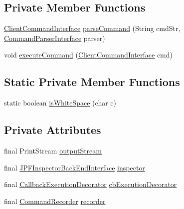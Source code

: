 \subsection*{Private Member Functions}
\begin{DoxyCompactItemize}
\item 
\hyperlink{interfacegov_1_1nasa_1_1jpf_1_1inspector_1_1client_1_1_client_command_interface}{Client\+Command\+Interface} \hyperlink{classgov_1_1nasa_1_1jpf_1_1inspector_1_1client_1_1_j_p_f_inspector_client_a5afa0d46d2d8be66673644f06e8f1bba}{parse\+Command} (String cmd\+Str, \hyperlink{interfacegov_1_1nasa_1_1jpf_1_1inspector_1_1client_1_1parser_1_1_command_parser_interface}{Command\+Parser\+Interface} parser)
\item 
void \hyperlink{classgov_1_1nasa_1_1jpf_1_1inspector_1_1client_1_1_j_p_f_inspector_client_ab0a5a605903e630c3cb672fcb0b02201}{execute\+Command} (\hyperlink{interfacegov_1_1nasa_1_1jpf_1_1inspector_1_1client_1_1_client_command_interface}{Client\+Command\+Interface} cmd)
\end{DoxyCompactItemize}
\subsection*{Static Private Member Functions}
\begin{DoxyCompactItemize}
\item 
static boolean \hyperlink{classgov_1_1nasa_1_1jpf_1_1inspector_1_1client_1_1_j_p_f_inspector_client_a9fad20c60114342e5cc098e662f51ed7}{is\+White\+Space} (char c)
\end{DoxyCompactItemize}
\subsection*{Private Attributes}
\begin{DoxyCompactItemize}
\item 
final Print\+Stream \hyperlink{classgov_1_1nasa_1_1jpf_1_1inspector_1_1client_1_1_j_p_f_inspector_client_ad5e02cdfa86797b3d16ab288e041b349}{output\+Stream}
\item 
final \hyperlink{interfacegov_1_1nasa_1_1jpf_1_1inspector_1_1interfaces_1_1_j_p_f_inspector_back_end_interface}{J\+P\+F\+Inspector\+Back\+End\+Interface} \hyperlink{classgov_1_1nasa_1_1jpf_1_1inspector_1_1client_1_1_j_p_f_inspector_client_aabfafb813aa9477130494c647d5ab2d8}{inspector}
\item 
final \hyperlink{classgov_1_1nasa_1_1jpf_1_1inspector_1_1client_1_1_callback_execution_decorator}{Callback\+Execution\+Decorator} \hyperlink{classgov_1_1nasa_1_1jpf_1_1inspector_1_1client_1_1_j_p_f_inspector_client_a6d747cd310776005b1fe089ddfd45d82}{cb\+Execution\+Decorator}
\item 
final \hyperlink{classgov_1_1nasa_1_1jpf_1_1inspector_1_1client_1_1_command_recorder}{Command\+Recorder} \hyperlink{classgov_1_1nasa_1_1jpf_1_1inspector_1_1client_1_1_j_p_f_inspector_client_a2c46859125dea92102448e2f64815a1b}{recorder}
\end{DoxyCompactItemize}


